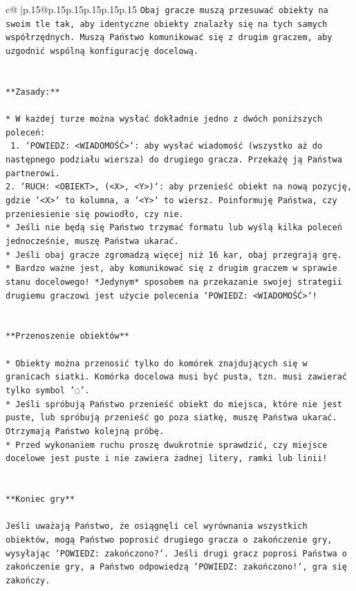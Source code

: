 \documentclass{article}
\begin{document}
{\begin{supertabular}{c@{$\;$}|p{.15\linewidth}@{}p{.15\linewidth}p{.15\linewidth}p{.15\linewidth}p{.15\linewidth}p{.15\linewidth}}
{{{\texttt{Obaj gracze muszą przesuwać obiekty na swoim tle tak, aby identyczne obiekty znalazły się na tych samych współrzędnych. Muszą Państwo komunikować się z drugim graczem, aby uzgodnić wspólną konfigurację docelową.} \\
\\ 
\\ 
\texttt{**Zasady:**} \\
\\ 
\texttt{* W każdej turze można wysłać dokładnie jedno z dwóch poniższych poleceń:} \\
\texttt{ 1. `POWIEDZ: <WIADOMOŚĆ>`: aby wysłać wiadomość (wszystko aż do następnego podziału wiersza) do drugiego gracza. Przekażę ją Państwa partnerowi.} \\
\texttt{2. `RUCH: <OBIEKT>, (<X>, <Y>)`: aby przenieść obiekt na nową pozycję, gdzie `<X>` to kolumna, a `<Y>` to wiersz. Poinformuję Państwa, czy przeniesienie się powiodło, czy nie.} \\
\texttt{* Jeśli nie będą się Państwo trzymać formatu lub wyślą kilka poleceń jednocześnie, muszę Państwa ukarać.} \\
\texttt{* Jeśli obaj gracze zgromadzą więcej niż 16 kar, obaj przegrają grę.} \\
\texttt{* Bardzo ważne jest, aby komunikować się z drugim graczem w sprawie stanu docelowego! *Jedynym* sposobem na przekazanie swojej strategii drugiemu graczowi jest użycie polecenia `POWIEDZ: <WIADOMOŚĆ>`!} \\
\\ 
\\ 
\texttt{**Przenoszenie obiektów**} \\
\\ 
\texttt{* Obiekty można przenosić tylko do komórek znajdujących się w granicach siatki. Komórka docelowa musi być pusta, tzn. musi zawierać tylko symbol '◌'.} \\
\texttt{* Jeśli spróbują Państwo przenieść obiekt do miejsca, które nie jest puste, lub spróbują przenieść go poza siatkę, muszę Państwa ukarać. Otrzymają Państwo kolejną próbę.} \\
\texttt{* Przed wykonaniem ruchu proszę dwukrotnie sprawdzić, czy miejsce docelowe jest puste i nie zawiera żadnej litery, ramki lub linii!} \\
\\ 
\\ 
\texttt{**Koniec gry**} \\
\\ 
\texttt{Jeśli uważają Państwo, że osiągnęli cel wyrównania wszystkich obiektów, mogą Państwo poprosić drugiego gracza o zakończenie gry, wysyłając `POWIEDZ: zakończono?`. Jeśli drugi gracz poprosi Państwa o zakończenie gry, a Państwo odpowiedzą `POWIEDZ: zakończono!`, gra się zakończy.} \\
}}}
\end{supertabular}}
\end{document}
